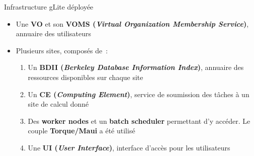 \documentclass[10pt,final,usepdftitle=false,handout]{beamer}
\begin{document}
	\begin{frame}{Infrastructure gLite déployée}
\begin{itemize}

	\item Une \textbf{VO} et son \textbf{VOMS (\textsl{Virtual Organization Membership Service})},
	annuaire des utilisateurs
					\bigskip

\item Plusieurs sites, composés de~:

		\bigskip
\begin{enumerate}

	\item Un \textbf{BDII (\textsl{Berkeley Database Information Index})}, annuaire
		des ressources disponibles sur chaque site

		\bigskip

	\item Un \textbf{CE (\textsl{Computing Element})}, service de soumission des
		tâches à un site de calcul donné
\bigskip
	\item Des \textbf{worker nodes} et un \textbf{batch scheduler}
		permettant d'y accéder. Le couple \textbf{Torque/Maui} a été
		utilisé

		\bigskip

	\item Une \textbf{UI (\textsl{User Interface})}, interface d'accès pour les
		utilisateurs

\end{enumerate}
\end{itemize}
	\end{frame}
\end{document}
